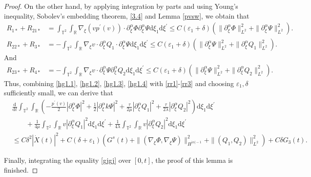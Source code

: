 \documentclass[10pt,reqno]{amsart}
\numberwithin{equation}{section}
\newcommand{\dif}{\mathrm{d}}
\begin{document}
\begin{proof}
On the other hand, by applying integration by parts and using Young's inequality, Sobolev's embedding theorem, \eqref{3.4} and Lemma \ref{pvsw}, we obtain that
\begin{equation}\label{rr1}
\begin{aligned}
R_{1\ast}+R_{21\ast}&=\int_{\mathbb{T}^2}\int_{\mathbb{R}}\nabla_\xi\left(vp^{\prime}(v)\right)\cdot
\partial_\xi^\alpha\Phi\partial_\xi^\alpha\Psi
\dif \xi_1\dif \xi^{\prime}
\le C(\varepsilon_1+\delta)\left(\|\partial_\xi^\alpha\Phi\|_{L^2}^2+\|\partial_\xi^\alpha\Psi\|_{L^2}^2\right).
\end{aligned}
\end{equation}
\begin{equation}\label{rr2}
\begin{aligned}
R_{22\ast}+R_{3\ast}&=-\int_{\mathbb{T}^2}\int_{\mathbb{R}}\nabla_\xi v\cdot\partial_\xi^\alpha Q_1\cdot\partial_\xi^\alpha\Psi\dif \xi_1\dif \xi^{\prime}
\le C(\varepsilon_1+\delta)\left(\|\partial_\xi^\alpha\Psi\|_{L^2}^2+\|\partial_\xi^\alpha Q_1\|_{L^2}^2\right).
\end{aligned}
\end{equation}
And
\begin{equation}\label{rr3}
\begin{aligned}
R_{23\ast}+R_{4\ast}&=-\int_{\mathbb{T}^2}\int_{\mathbb{R}}\nabla_\xi v\cdot\partial_\xi^\alpha\Psi\partial_\xi^\alpha Q_2\dif \xi_1\dif \xi^{\prime}
\le C(\varepsilon_1+\delta)\left(\|\partial_\xi^\alpha\Psi\|_{L^2}^2+\|\partial_\xi^\alpha Q_2\|_{L^2}^2\right).
\end{aligned}
\end{equation}
Thus, combining \eqref{hg1.1}, \eqref{hg1.2}, \eqref{hg1.3}, \eqref{hg1.4} with \eqref{rr1}-\eqref{rr3} and choosing $\varepsilon_1, \delta$ sufficiently small, we can derive that
\begin{equation}\label{gjgj}
\begin{aligned}
&\frac{\dif}{\dif t}\int_{\mathbb{T}^2}\int_{\mathbb{R}}\left(
-\frac{p^\prime(v)}{2}|\partial_\xi^\alpha \Phi|^2+\frac{1}{2}|\partial_\xi^\alpha k\Psi|^2
+\frac{\tau}{2\mu}|\partial_\xi^\alpha Q_1|^2+\frac{\tau}{2\lambda}|\partial_\xi^\alpha Q_2|^2
\right)\dif \xi_1\dif \xi^{\prime}\\
&\qquad+\frac{1}{4\mu}\int_{\mathbb{T}^2}\int_{\mathbb{R}}
 v|\partial_\xi^\alpha Q_1|^2\dif \xi_1\dif \xi^{\prime}
 +\frac{1}{4\lambda}\int_{\mathbb{T}^2}\int_{\mathbb{R}}
 v|\partial_\xi^\alpha Q_2|^2\dif \xi_1\dif \xi^{\prime}\\
 &\le C\delta^2|\dot X(t)|^2+C(\delta+\varepsilon_1)\left(G^s(t)+\|(\nabla_\xi \Phi,  \nabla_\xi\Psi) \|_{H^{|\alpha|-1}}^2
 +\|(Q_1, Q_2)\|_{L^2}^2\right)
 +C\delta G_3(t).
\end{aligned}
\end{equation}

Finally, integrating the equality \eqref{gjgj} over $[0, t]$, the proof of this lemma is finished.
\end{proof}
\end{document}
